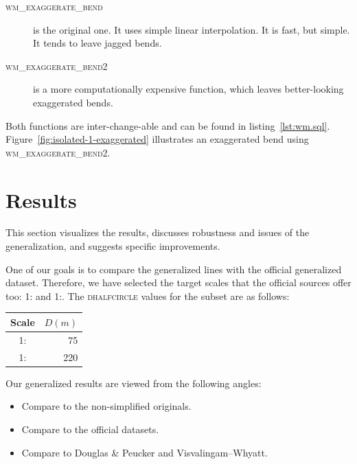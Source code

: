 \documentclass[a4paper]{article}
\newcommand{\DP}{Douglas \& Peucker}
\newcommand{\VW}{Visvalingam--Whyatt}
\begin{document}
\begin{description}

    \item[\normalfont\textsc{wm\_exaggerate\_bend}] is the original one. It
        uses simple linear interpolation. It is fast, but simple. It tends to
        leave jagged bends.

    \item[\normalfont\textsc{wm\_exaggerate\_bend2}] is a more computationally
        expensive function, which leaves better-looking exaggerated bends.

\end{description}

Both functions are inter-change-able and can be found in listing~\ref{lst:wm.sql}.
Figure~\ref{fig:isolated-1-exaggerated} illustrates an exaggerated bend using
\textsc{wm\_exaggerate\_bend2}.

\section{Results}
\label{sec:results}

This section visualizes the results, discusses robustness and issues of the
generalization, and suggests specific improvements.

One of our goals is to compare the generalized lines with the official
generalized dataset\cite{nzt}. Therefore, we have selected the target scales
that the official sources offer too: 1: and
1:. The \textsc{dhalfcircle} values for the subset are as
follows:

\begin{table}[ht]
    \centering
    \begin{tabular}{ c  D{.}{.}{1} }
        Scale               &   \\ :  &  75                         \\
        1: & 220                         \\
    \end{tabular}
\end{table}

Our generalized results are viewed from the following angles:
\begin{itemize}
    \item Compare to the non-simplified originals.
    \item Compare to the official datasets.
    \item Compare to {\DP} and {\VW}.
\end{itemize}
\end{document}
